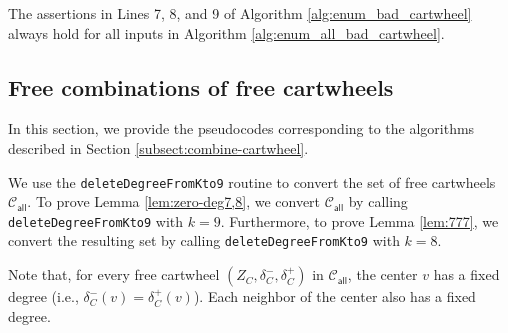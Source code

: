 \documentclass[main.tex]{subfiles}
\begin{document}
\begin{lem}
\label{lem:for-lem:positive-comp}
    The assertions in Lines 7, 8, and 9 of Algorithm \ref{alg:enum_bad_cartwheel} always hold for all inputs in Algorithm \ref{alg:enum_all_bad_cartwheel}.
\end{lem}

\subsection{Free combinations of free cartwheels}
\newcommand{\deleteDegreeFromKtoN}{\texttt{deleteDegreeFromKto9}\xspace}
\newcommand{\combineEachCartwheel}{\texttt{combineEachCartwheel}\xspace}
\newcommand{\combineEachCartwheelTwice}{\texttt{combineEachCartwheelTwice}\xspace}
\newcommand{\checkDegE}{\texttt{checkDeg8}\xspace}
\newcommand{\checkEE}{\texttt{check88}\xspace}
\newcommand{\checkES}{\texttt{check87}\xspace}
\newcommand{\checkSES}{\texttt{check787}\xspace}
\newcommand{\containX}{\texttt{containX}\xspace}
\newcommand{\checkStriangle}{\texttt{check7triangle}\xspace}
\newcommand{\checkDegS}{\texttt{checkDeg7}\xspace}
\newcommand{\checkSS}{\texttt{check77}\xspace}
\newcommand{\checkSSS}{\texttt{check777}\xspace}
In this section, we provide the pseudocodes corresponding to the algorithms described in Section \ref{subsect:combine-cartwheel}.

We use the \deleteDegreeFromKtoN routine to convert the set of free cartwheels $\mathcal{C}_{\textsf{all}}$.
To prove Lemma \ref{lem:zero-deg7,8}, we convert $\mathcal{C}_{\textsf{all}}$ by calling \deleteDegreeFromKtoN with $k=9$.
Furthermore, to prove Lemma \ref{lem:777}, we convert the resulting set by calling \deleteDegreeFromKtoN with $k=8$.


Note that, for every free cartwheel $(Z_C, \delta_C^-, \delta_C^+)$ in $\mathcal{C}_{\textsf{all}}$, the center $v$ has a fixed degree (i.e., $\delta_C^-(v)=\delta_C^+(v)$).
Each neighbor of the center also has a fixed degree. 
\end{document}
